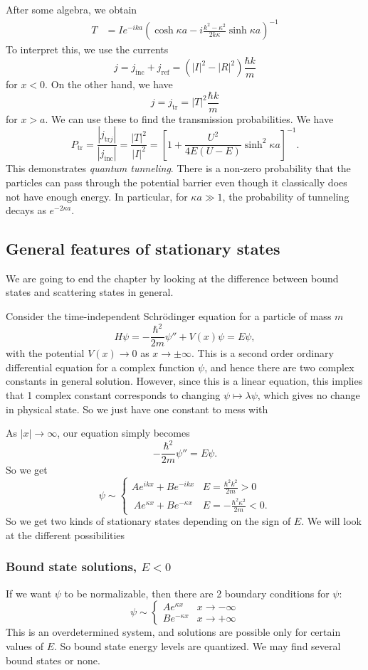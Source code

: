 \documentclass[a4paper]{article}
\begin{document}
After some algebra, we obtain
\begin{align*}
  T &= I e^{-ika}\left(\cosh \kappa a - i\frac{k^2 - \kappa^2}{2k\kappa} \sinh \kappa a\right)^{-1}
\end{align*}
To interpret this, we use the currents
\[
  j = j_{\mathrm{inc}} + j_{\mathrm{ref}} = (|I|^2 - |R|^2) \frac{\hbar k}{m}
\]
for $x < 0$. On the other hand, we have
\[
  j = j_{\mathrm{tr}} = |T|^2 \frac{\hbar k}{m}
\]
for $x > a$. We can use these to find the transmission probabilities. We have
\[
  P_{\mathrm{tr}} = \frac{|j_{\mathrm{tr}j}|}{|j_{\mathrm{inc}}|} = \frac{|T|^2}{|I|^2} = \left[1 + \frac{U^2}{4E(U - E)} \sinh^2 \kappa a\right]^{-1}.
\]
This demonstrates \emph{quantum tunneling}. There is a non-zero probability that the particles can pass through the potential barrier even though it classically does not have enough energy. In particular, for $\kappa a \gg 1$, the probability of tunneling decays as $e^{-2\kappa a}$.

\subsection{General features of stationary states}
We are going to end the chapter by looking at the difference between bound states and scattering states in general.

Consider the time-independent Schr\"odinger equation for a particle of mass $m$
\[
  H\psi = -\frac{\hbar^2}{2m}\psi'' + V(x) \psi = E\psi,
\]
with the potential $V(x) \to 0$ as $x \to \pm \infty$. This is a second order ordinary differential equation for a complex function $\psi$, and hence there are two complex constants in general solution. However, since this is a linear equation, this implies that 1 complex constant corresponds to changing $\psi \mapsto \lambda \psi$, which gives no change in physical state. So we just have one constant to mess with

As $|x| \to \infty$, our equation simply becomes
\[
  -\frac{\hbar^2}{2m} \psi'' = E\psi.
\]
So we get
\[
  \psi \sim
  \begin{cases}
    Ae^{ikx} + Be^{-ikx} & E = \frac{\hbar^2 k^2}{2m} > 0\\\
    Ae^{\kappa x} + Be^{-\kappa x} & E = -\frac{\hbar^2 \kappa^2}{2m} < 0.
  \end{cases}
\]
So we get two kinds of stationary states depending on the sign of $E$. We will look at the different possibilities
\subsubsection*{Bound state solutions, \texorpdfstring{$E < 0$}{E \lt 0}}
If we want $\psi$ to be normalizable, then there are 2 boundary conditions for $\psi$:
\[
  \psi \sim
  \begin{cases}
    Ae^{\kappa x} & x \to -\infty\\
    B e^{-\kappa x} & x \to +\infty
  \end{cases}
\]
This is an overdetermined system, and solutions are possible only for certain values of $E$. So bound state energy levels are quantized. We may find several bound states or none.
\end{document}
